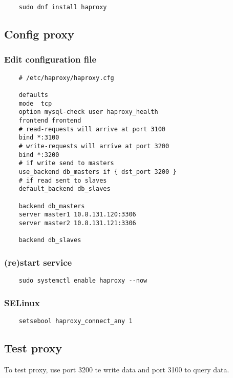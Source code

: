 \begin{lstlisting}
    sudo dnf install haproxy
\end{lstlisting}

\subsection{Config proxy}

\subsubsection{Edit configuration file}

\begin{lstlisting}
    # /etc/haproxy/haproxy.cfg
    
    defaults
    mode  tcp
    option mysql-check user haproxy_health
    frontend frontend
    # read-requests will arrive at port 3100
    bind *:3100
    # write-requests will arrive at port 3200
    bind *:3200
    # if write send to masters
    use_backend db_masters if { dst_port 3200 }
    # if read sent to slaves
    default_backend db_slaves
    
    backend db_masters
    server master1 10.8.131.120:3306
    server master2 10.8.131.121:3306
    
    backend db_slaves
\end{lstlisting}

\subsubsection{(re)start service}

\begin{lstlisting}
    sudo systemctl enable haproxy --now
\end{lstlisting}

\subsubsection{SELinux}

\begin{lstlisting}
    setsebool haproxy_connect_any 1
\end{lstlisting}

\subsection{Test proxy}

To test proxy, use  port 3200 te write data and port 3100 to query data.